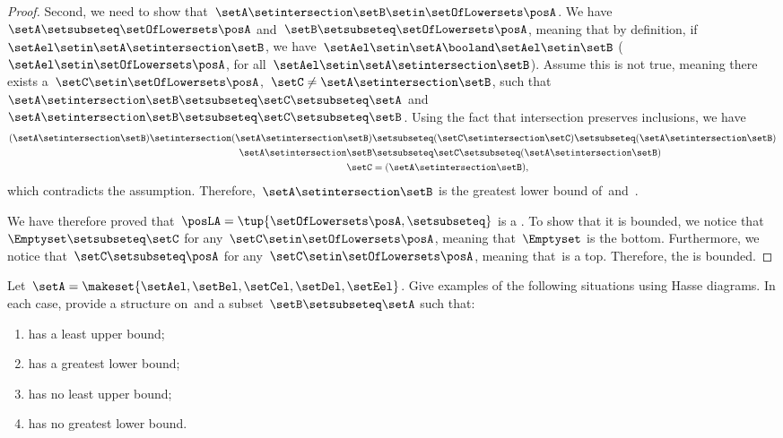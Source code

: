 \begin{proof}
    Second, we need to show that~$\setA \setintersection \setB\setin \setOfLowersets \posA$.
    We have~$\setA \setsubseteq \setOfLowersets \posA$ and~$\setB\setsubseteq \setOfLowersets \posA$, meaning that by definition, if~$\setAel\setin \setA\setintersection \setB$, we have~$\setAel \setin \setA\booland \setAel\setin \setB$ ($\setAel\setin \setOfLowersets \posA$, for all~$\setAel\setin \setA \setintersection \setB$).
    Assume this is not true, meaning there exists a~$\setC\setin \setOfLowersets \posA$,~$\setC\neq \setA\setintersection \setB$, such that~$\setA\setintersection \setB\setsubseteq \setC\setsubseteq \setA$ and~$\setA\setintersection \setB\setsubseteq \setC\setsubseteq \setB$.
    Using the fact that intersection preserves inclusions, we have
    \begin{equation}
        \begin{aligned}
            (\setA\setintersection \setB)
            \setintersection (\setA\setintersection \setB) & \setsubseteq (\setC \setintersection \setC) \setsubseteq (\setA\setintersection \setB) \\
            \setA\setintersection \setB                    & \setsubseteq \setC\setsubseteq (\setA\setintersection \setB) \\
            \setC                                          & =(\setA\setintersection \setB),
        \end{aligned}
    \end{equation}
    which contradicts the assumption.
    Therefore,~$\setA\setintersection \setB$ is the greatest lower bound of~\setA and~\setB.

    We have therefore proved that~$\posLA=\tup{\setOfLowersets \posA,\setsubseteq}$ is a .
    To show that it is bounded, we notice that~$\Emptyset \setsubseteq \setC$ for any~$\setC\setin \setOfLowersets \posA$, meaning that~$\Emptyset$ is the bottom.
    Furthermore, we notice that~$\setC\setsubseteq \posA$ for any~$\setC\setin \setOfLowersets \posA$, meaning that~\posA is a top.
    Therefore, the  is bounded.
\end{proof}

\vfill

\begin{gradedexercise}
    \label{ex:UpperLowerBounds}
    Let~$\setA = \makeset{\setAel, \setBel, \setCel, \setDel, \setEel }$.
    Give examples of the following situations using Hasse diagrams.
    In each case, provide a  structure on~\setA and a subset~$\setB \setsubseteq \setA$ such that:
    \begin{enumerate}
        \item \setB has a least upper bound;
        \item \setB has a greatest lower bound;
        \item \setB has no least upper bound;
        \item \setB has no greatest lower bound.
    \end{enumerate}
\end{gradedexercise}

